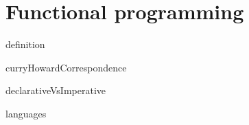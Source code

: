 \section{Functional programming}

{definition}

{curryHowardCorrespondence}


{declarativeVsImperative}



{languages}